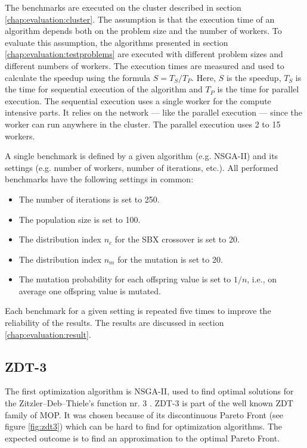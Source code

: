 The benchmarks are executed on the cluster described in section \ref{chap:evaluation:cluster}. The assumption is that the execution time of an algorithm depends both on the problem size and the number of workers. To evaluate this assumption, the algorithms presented in section \ref{chap:evaluation:testproblems} are executed with different problem sizes and different numbers of workers. The execution times are measured and used to calculate the speedup using the formula $S = T_S / T_P$. Here, $S$ is the speedup, $T_S$ is the time for sequential execution of the algorithm and $T_P$ is the time for parallel execution. The sequential execution uses a single worker for the compute intensive parts. It relies on the network --- like the parallel execution --- since the worker can run anywhere in the cluster. The parallel execution uses 2 to 15 workers.

A single benchmark is defined by a given algorithm (e.g. NSGA-II) and its settings (e.g. number of workers, number of iterations, etc.). All performed benchmarks have the following settings in common:
\begin{itemize}
  \item The number of iterations is set to 250.
  \item The population size is set to 100.
  \item The distribution index $n_c$ for the SBX crossover is set to 20.
  \item The distribution index $n_m$ for the mutation is set to 20.
  \item The mutation probability for each offspring value is set to $1/n$, i.e., on average one offspring value is mutated.
\end{itemize}

Each benchmark for a given setting is repeated five times to improve the reliability of the results. The results are discussed in section \ref{chap:evaluation:result}.


\subsection{ZDT-3}
\label{chap:evaluation:zdt3}
The first optimization algorithm is NSGA-II, used to find optimal solutions for the Zitzler–Deb–Thiele's function nr. 3 \cite{zitzler2000comparison}. ZDT-3 is part of the well known ZDT family of MOP. It was chosen because of its discontinuous Pareto Front (see figure \ref{fig:zdt3}) which can be hard to find for optimization algorithms. The expected outcome is to find an approximation to the optimal Pareto Front.


